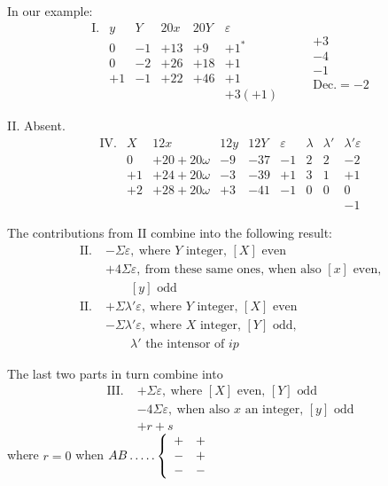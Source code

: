 In our example:
\[
\begin{array}{rc|r|r|r|r}
\mathrm{I.}&y&Y&20x&20Y&\varepsilon\\
&0&-1&+13&+9&+1^{*}\\
&0&-2&+26&+18&+1\\
&+1&-1&+22&+46&+1\\
&&&&&+3(+1)
\end{array}
\qquad
\begin{array}{r}
+3\\-4\\-1\\\hline
\text{Dec.}=-2
\end{array}
\]

II. Absent.
\begingroup\small\setlength{\arraycolsep}{2pt}
\[
\begin{array}{rc|r|r|r|r|r|r|r}
\mathrm{IV.}&X&12x&12y&12Y&\varepsilon&\lambda&\lambda'&\lambda'\varepsilon\\
&0&+20+20\omega&-9&-37&-1&2&2&-2\\
&+1&+24+20\omega&-3&-39&+1&3&1&+1\\
&+2&+28+20\omega&+3&-41&-1&0&0&0\\
&&&&&&&&-1
\end{array}
\]
\endgroup

The contributions from II combine into the following result:
\[
\begin{aligned}
\mathrm{II.}\;&-\Sigma\varepsilon,\ \text{where }Y\text{ integer, }[X]\text{ even}\\
&+4\Sigma\varepsilon,\ \text{from these same ones, when also }[x]\text{ even,}\\
&\qquad[y]\text{ odd}\\
\mathrm{II.}\;&+\Sigma\lambda'\varepsilon,\ \text{where }Y\text{ integer, }[X]\text{ even}\\
&-\Sigma\lambda'\varepsilon,\ \text{where }X\text{ integer, }[Y]\text{ odd,}\\
&\qquad\lambda'\text{ the intensor of }ip
\end{aligned}
\]

The last two parts in turn combine into
\[
\begin{aligned}
\mathrm{III.}\;&+\Sigma\varepsilon,\ \text{where }[X]\text{ even, }[Y]\text{ odd}\\
&-4\Sigma\varepsilon,\ \text{when also }x\text{ an integer, }[y]\text{ odd}\\
&+r+s
\end{aligned}
\]
where $r=0$ when $AB\mathinner{.\,.\,.\,.\,.}\left\{\begin{array}{cc}+&+\\-&+\\-&-\end{array}\right.$

